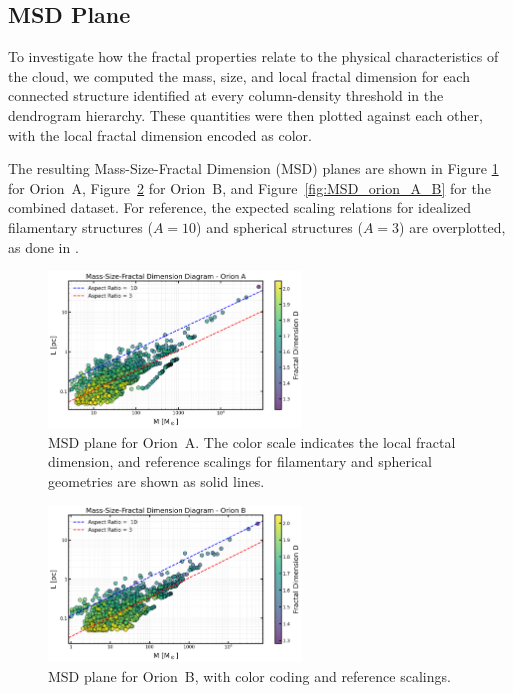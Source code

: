 \subsection{MSD Plane}

To investigate how the fractal properties relate to the physical characteristics of the cloud, we computed the mass, size, and local fractal dimension for each connected structure identified at every column-density threshold in the dendrogram hierarchy.  
These quantities were then plotted against each other, with the local fractal dimension encoded as color.  

The resulting Mass-Size-Fractal Dimension (MSD) planes are shown in Figure \ref{fig:MSD_orion_A} for Orion~A, Figure~\ref{fig:MSD_orion_B} for Orion~B, and Figure~\ref{fig:MSD_orion_A_B} for the combined dataset.  
For reference, the expected scaling relations for idealized filamentary structures (\(A = 10\)) and spherical structures (\(A = 3\)) are overplotted, as done in \cite{Hacar_2025}.

\begin{figure}[t]
    \centering
    \includegraphics[width=0.6\textwidth]{figures/MSD_Orion_A.png}
    \caption{MSD plane for Orion~A. The color scale indicates the local fractal dimension, and reference scalings for filamentary and spherical geometries are shown as solid lines.}
    \label{fig:MSD_orion_A}
\end{figure}

\begin{figure}[t]
    \centering
    \includegraphics[width=0.6\textwidth]{figures/MSD_Orion_B.png}
    \caption{MSD plane for Orion~B, with color coding and reference scalings.}
    \label{fig:MSD_orion_B}
\end{figure}

